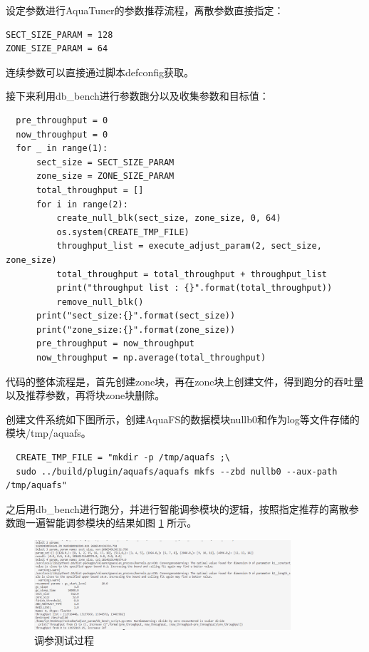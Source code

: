 设定参数进行AquaTuner的参数推荐流程，离散参数直接指定：

\begin{lstlisting}
SECT_SIZE_PARAM = 128
ZONE_SIZE_PARAM = 64
\end{lstlisting}

连续参数可以直接通过脚本defconfig获取。

接下来利用db\_bench进行参数跑分以及收集参数和目标值：

\begin{lstlisting}
  pre_throughput = 0
  now_throughput = 0
  for _ in range(1):
      sect_size = SECT_SIZE_PARAM
      zone_size = ZONE_SIZE_PARAM
      total_throughput = []
      for i in range(2):
          create_null_blk(sect_size, zone_size, 0, 64)
          os.system(CREATE_TMP_FILE)
          throughput_list = execute_adjust_param(2, sect_size, zone_size)
          total_throughput = total_throughput + throughput_list
          print("throughput list : {}".format(total_throughput))
          remove_null_blk()
      print("sect_size:{}".format(sect_size))
      print("zone_size:{}".format(zone_size))
      pre_throughput = now_throughput
      now_throughput = np.average(total_throughput)
\end{lstlisting}

代码的整体流程是，首先创建zone块，再在zone块上创建文件，得到跑分的吞吐量以及推荐参数，再将块zone块删除。

创建文件系统如下图所示，创建AquaFS的数据模块nullb0和作为log等文件存储的模块/tmp/aquafs。

\begin{lstlisting}
  CREATE_TMP_FILE = "mkdir -p /tmp/aquafs ;\
  sudo ../build/plugin/aquafs/aquafs mkfs --zbd nullb0 --aux-path /tmp/aquafs"
\end{lstlisting}

之后用db\_bench进行跑分，并进行智能调参模块的逻辑，按照指定推荐的离散参数跑一遍智能调参模块的结果如图 \ref{test-turnner2} 所示。

\begin{figure}[htbp]
  \centering
  \includegraphics[width=0.85\textwidth]{fig/turnner2.png}
  \caption{ 调参测试过程 }
  \label{test-turnner2}
\end{figure}

